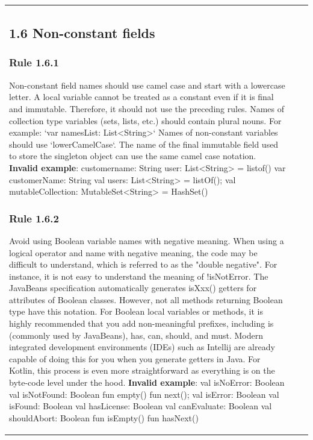 \begin{center}
\begin{tabular}{ |p{}|p{}|p{}| }
\subsection*{\textbf{1.6 Non-constant fields}}
\subsubsection*{\textbf{Rule 1.6.1}}
Non-constant field names should use camel case and start with a lowercase letter.
A local variable cannot be treated as a constant even if it is final and immutable. Therefore, it should not use the preceding rules. Names of collection type variables (sets, lists, etc.) should contain plural nouns.
For example: `var namesList: List<String>`
Names of non-constant variables should use `lowerCamelCase`. The name of the final immutable field used to store the singleton object can use the same camel case notation.
\textbf{Invalid example}:
customername: String
user: List<String> = listof()
var customerName: String
val users: List<String> = listOf();
val mutableCollection: MutableSet<String> = HashSet()
\subsubsection*{\textbf{Rule 1.6.2}}
Avoid using Boolean variable names with negative meaning. When using a logical operator and name with negative meaning, the code may be difficult to understand, which is referred to as the "double negative".
For instance, it is not easy to understand the meaning of !isNotError.
The JavaBeans specification automatically generates isXxx() getters for attributes of Boolean classes.
However, not all methods returning Boolean type have this notation.
For Boolean local variables or methods, it is highly recommended that you add non-meaningful prefixes, including is (commonly used by JavaBeans), has, can, should, and must. Modern integrated development environments (IDEs) such as Intellij are already capable of doing this for you when you generate getters in Java. For Kotlin, this process is even more straightforward as everything is on the byte-code level under the hood.
\textbf{Invalid example}:
val isNoError: Boolean
val isNotFound: Boolean
fun empty()
fun next();
val isError: Boolean
val isFound: Boolean
val hasLicense: Boolean
val canEvaluate: Boolean
val shouldAbort: Boolean
fun isEmpty()
fun hasNext()

\end{tabular}
\end{center}
